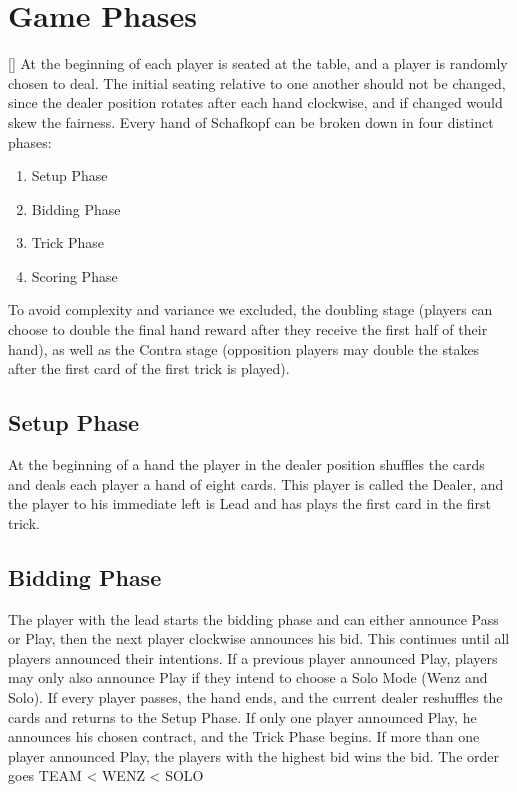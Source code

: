 \section{Game Phases}[\label{gamephases}]
At the beginning of each player is seated at the table, and a player is randomly chosen to deal.
The initial seating relative to one another should not be changed, since the dealer position rotates after each hand
clockwise, and if changed would skew the fairness.
\newline
Every hand of Schafkopf can be broken down in four distinct phases:
\begin{enumerate}
    \item Setup Phase
    \item Bidding Phase
    \item Trick Phase
    \item Scoring Phase
\end{enumerate}
To avoid complexity and variance we excluded, the doubling stage (players can choose to double the final hand reward
after they receive the first half of their hand), as well as the Contra stage (opposition players may double the
stakes after the first card of the first trick is played).

\subsection{Setup Phase}
At the beginning of a hand the player in the dealer position shuffles the cards and deals each player a hand of eight
cards.
This player is called the Dealer, and the player to his immediate left is Lead and has plays the first card in the
first trick.

\subsection{Bidding Phase}
The player with the lead starts the bidding phase and can either announce Pass or Play, then the next player
clockwise announces his bid.
This continues until all players announced their intentions.
If a previous player announced Play, players may only also announce Play if they intend to choose a Solo Mode (Wenz
and Solo).
If every player passes, the hand ends, and the current dealer reshuffles the cards and returns to the Setup Phase.
If only one player announced Play, he announces his chosen contract, and the Trick Phase begins.
If more than one player announced Play, the players with the highest bid wins the bid.
The order goes TEAM < WENZ < SOLO

